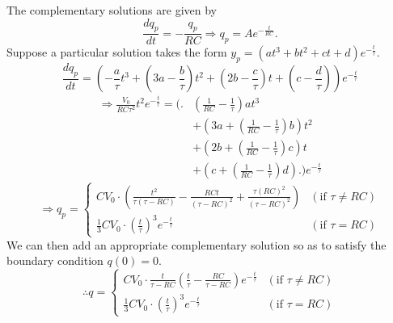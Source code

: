 \item

The complementary solutions are given by
\[
	\frac{dq_p}{dt} = -\frac{q_p}{RC}
	\Rightarrow q_p = A e^{-\frac{t}{RC}}.
\]
Suppose a particular solution takes the form $y_p = (at^3 + bt^2 + ct + d)e^{-\frac{t}{\tau}}$.
\[
	\frac{dq_p}{dt} = \left( -\frac{a}{\tau}t^3 + \left( 3a - \frac{b}{\tau} \right)t^2 + \left( 2b - \frac{c}{\tau} \right)t + \left( c - \frac{d}{\tau} \right) \right) e^{-\frac{t}{\tau}}
\]
\begin{align*}
	\Rightarrow \frac{V_0}{RC\tau^2}t^2 e^{-\frac{t}{\tau}}
	= \Biggl(\Biggr.
	 & \left( \frac{1}{RC} - \frac{1}{\tau} \right)at^3                       \\
	 & + \left( 3a + \left( \frac{1}{RC} - \frac{1}{\tau} \right)b \right)t^2 \\
	 & + \left( 2b + \left( \frac{1}{RC} - \frac{1}{\tau} \right)c \right)t   \\
	 & + \left(  c + \left( \frac{1}{RC} - \frac{1}{\tau} \right)d\right)
	\Biggl.\Biggr) e^{-\frac{t}{\tau}}
\end{align*}
\[
	\Rightarrow q_p =
	\begin{cases}
		CV_0 \cdot \left(
		\frac{t^2}{\tau (\tau - RC)} - \frac{RCt}{{(\tau - RC)}^2} + \frac{\tau {(RC)}^2}{{(\tau - RC)}^2}
		\right)
		 & (\text{if } \tau \neq RC) \\
		\frac{1}{3} CV_0 \cdot {\left( \frac{t}{\tau} \right)}^3 e^{-\frac{t}{\tau}}
		 & (\text{if } \tau = RC)
	\end{cases}
\]
We can then add an appropriate complementary solution so as to satisfy the boundary condition $q(0) = 0$.
\[
	\therefore q =
	\begin{cases}
		CV_0 \cdot \frac{t}{\tau - RC} \left( \frac{t}{\tau} - \frac{RC}{\tau - RC} \right) e^{-\frac{t}{\tau}}
		 & (\text{if } \tau \neq RC) \\
		\frac{1}{3} CV_0 \cdot {\left( \frac{t}{\tau} \right)}^3 e^{-\frac{t}{\tau}}
		 & (\text{if } \tau = RC)
	\end{cases}
\]